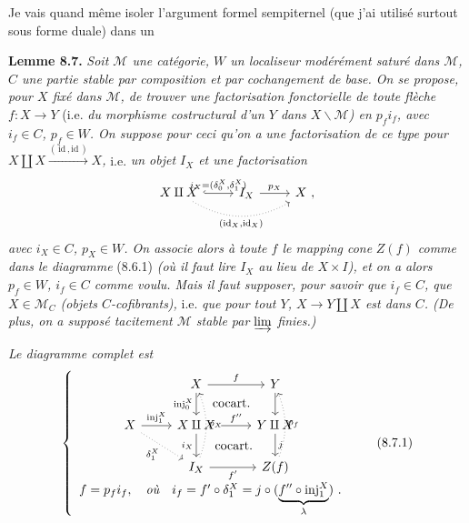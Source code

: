 \documentclass[11pt]{article}
\newcommand{\printedpage}[1]{\marginpar{\footnotesize p.~#1}}
\newcommand{\msp}[1]{\marginpar{\footnotesize [#1]}}
\begin{document}
Je vais quand même isoler l'argument formel sempiternel (que j'ai utilisé surtout sous forme duale) dans un

\textbf{Lemme 8.7.} \textit{Soit $\mathcal{M}$ une catégorie, $W$ un localiseur modérément saturé dans $\mathcal{M}$, $C$ une partie stable par composition et par cochangement de base. On se propose, pour $X$ fixé dans $\mathcal{M}$, de trouver une factorisation fonctorielle de toute flèche $f : X \longrightarrow Y$} (i.e. \textit{du morphisme costructural d'un $Y$ dans $X\backslash\mathcal{M}$) en $p_f i_f$, avec $i_f \in C$, $p_f \in W$. On suppose pour ceci qu'on a}
\msp{page 113}
\textit{une factorisation de ce type pour $X \amalg X \xrightarrow{(\,\mathrm{id}\,,\mathrm{id}\,)} X$,} i.e. \textit{un objet $I_X$ et une factorisation}
\[
\begin{tikzcd}
X \amalg X \arrow[r, hook, "{i_X = (\delta_0^X,\delta_1^X)}"] \arrow[rr, dotted, bend right, "{(\mathrm{id}_X,\mathrm{id}_X)}"'] & I_X \arrow[r, "p_X"] & X\ ,
\end{tikzcd}
\]
\textit{avec $i_X \in C$, $p_X \in W$. On associe alors à toute $f$ le mapping cone} \textit{$Z(f)$ comme dans le diagramme} (8.6.1) \textit{(où il faut lire $I_X$ au lieu de $X \times I$), et on a alors $p_f \in W$, $i_f \in C$ comme voulu. Mais il faut supposer, pour savoir que $i_f \in C$, que $X \in \mathcal{M}_C$ (objets $C$-cofibrants),} i.e. \textit{que pour tout $Y$, $X \longrightarrow Y \amalg X$ est dans $C$. (De plus, on a supposé tacitement $\mathcal{M}$ stable par $\varinjlim$ finies.)}

\printedpage{62}

\textit{Le diagramme complet est}
\[
\left\{
\begin{array}{c}
\begin{tikzcd}[ampersand replacement=\&]
 \& X \arrow[r, "f"] \arrow[d, "\mathrm{inj}_0^X"'] \arrow[dr, phantom, "\text{cocart.}"] \& Y \arrow[d] \\
X \arrow[r, "\mathrm{inj}_1^X"] \arrow[dr, dotted, "\delta_1^X"'] \& X \amalg X \arrow[r, "f''"] \arrow[d, "i_X"'] \arrow[dr, phantom, "\text{cocart.}"] \& Y \amalg X \arrow[d, "j"] \\
 \& I_X \arrow[r, "f'"'] \arrow[uu, dotted, bend right=20, "p_X"'] \& Z(f) \arrow[uu, dotted, bend right=20, "p_f"']
\end{tikzcd}
\\[1ex]
f = p_f i_f, \quad \textit{où} \quad i_f = f' \circ \delta_1^X = j \circ (\underbrace{f'' \circ \mathrm{inj}_1^X}_{\lambda})\ .
\end{array}
\right.
\tag*{(8.7.1)}
\]
\end{document}
